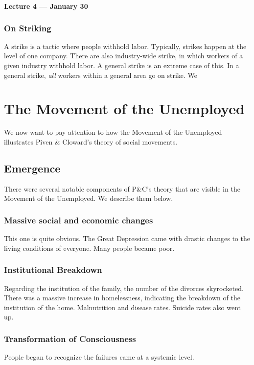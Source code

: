 \vspace{3mm}
\noindent \textbf{Lecture 4 --- January 30\th}

\setcounter{section}{0}

\subsubsection{On Striking}
A strike is a tactic where people withhold labor.
Typically, strikes happen at the level of one company.
There are also industry-wide strike, in which workers of a given industry withhold labor.
A general strike is an extreme case of this.
In a general strike, \textit{all} workers within a general area go on strike.
We

\section{The Movement of the Unemployed}
We now want to pay attention to how the Movement of the Unemployed illustrates Piven \& Cloward's theory of social movements.

\subsection{Emergence}
There were several notable components of P\&C's theory that are visible in the Movement of the Unemployed.
We describe them below.

\subsubsection{Massive social and economic changes}
This one is quite obvious.
The Great Depression came with drastic changes to the living conditions of everyone.
Many people became poor.


\subsubsection{Institutional Breakdown}
Regarding the institution of the family, the number of the divorces skyrocketed.
There was a massive increase in homelessness, indicating the breakdown of the institution of the home.
Malnutrition and disease rates.
Suicide rates also went up.

\subsubsection{Transformation of Consciousness}
People began to recognize the failures came at a systemic level.

